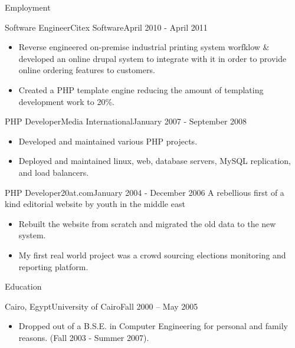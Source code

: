 \documentclass[]{mosabcv}
\begin{document}
\begin{cvsection}{Employment}
		\begin{cvsubsection}{Software Engineer}{Citex Software}{April 2010 - April 2011}
			\begin{itemize}
				\item Reverse engineered on-premise industrial printing system worfklow \& developed an online drupal system to integrate with it in order to provide online ordering features to customers.
				\item Created a PHP template engine reducing the amount of templating development work to 20\%.
			\end{itemize}
		\end{cvsubsection}
		
		\begin{cvsubsection}{PHP Developer}{Media International}{January 2007 - September 2008}
			\begin{itemize}
				\item Developed and maintained various PHP projects.
                \item Deployed and maintained linux, web, database servers, MySQL replication, and load balancers.
			\end{itemize}
		\end{cvsubsection}
		
		\begin{cvsubsection}{PHP Developer}{20at.com}{January 2004 - December 2006}
			A rebellious first of a kind editorial website by youth in the middle east
			\begin{itemize}
				\item Rebuilt the website from scratch and migrated the old data to the new system.
				\item My first real world project was a crowd sourcing elections monitoring and reporting platform.
			\end{itemize}
		\end{cvsubsection}
		
	\end{cvsection}
	
	\begin{cvsection}{Education}
		\begin{cvsubsection}{Cairo, Egypt}{University of Cairo}{Fall 2000 -- May 2005}
			\begin{itemize}
				\item Dropped out of a B.S.E. in Computer Engineering for personal and family reasons. (Fall 2003 - Summer 2007).
			\end{itemize}
		\end{cvsubsection}
	\end{cvsection}
\end{document}
